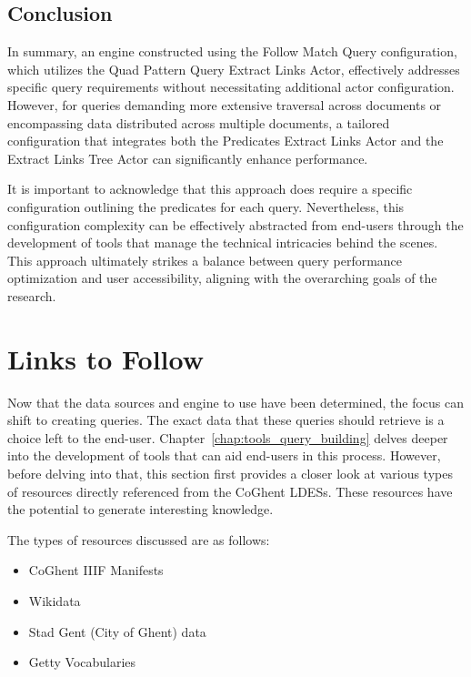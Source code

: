 \subsection{Conclusion}

In summary, an engine constructed using the Follow Match Query configuration, which utilizes the Quad Pattern Query Extract Links Actor, effectively addresses specific query requirements without necessitating additional actor configuration. However, for queries demanding more extensive traversal across documents or encompassing data distributed across multiple documents, a tailored configuration that integrates both the Predicates Extract Links Actor and the Extract Links Tree Actor can significantly enhance performance. 

It is important to acknowledge that this approach does require a specific configuration outlining the predicates for each query. Nevertheless, this configuration complexity can be effectively abstracted from end-users through the development of tools that manage the technical intricacies behind the scenes. This approach ultimately strikes a balance between query performance optimization and user accessibility, aligning with the overarching goals of the research.

\section{Links to Follow}
\label{sec:links_to_follow}

Now that the data sources and engine to use have been determined, the focus can shift to creating queries. The exact data that these queries should retrieve is a choice left to the end-user. Chapter~\ref{chap:tools_query_building} delves deeper into the development of tools that can aid end-users in this process. However, before delving into that, this section first provides a closer look at various types of resources directly referenced from the CoGhent LDESs. These resources have the potential to generate interesting knowledge.

The types of resources discussed are as follows:
\begin{itemize}
    \item CoGhent IIIF Manifests
    \item Wikidata
    \item Stad Gent (City of Ghent) data
    \item Getty Vocabularies
\end{itemize}

